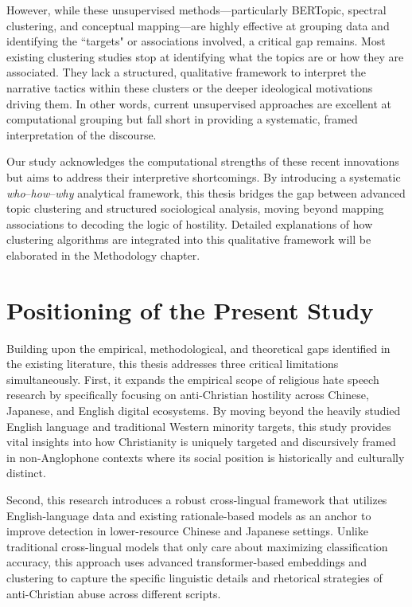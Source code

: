 \documentclass[../CLthesis.tex]{subfiles}
\begin{document}
However, while these unsupervised methods—particularly BERTopic, spectral clustering, and conceptual mapping—are highly effective at grouping data and identifying the ``targets" or associations involved, a critical gap remains. Most existing clustering studies stop at identifying what the topics are or how they are associated. They lack a structured, qualitative framework to interpret the narrative tactics within these clusters or the deeper ideological motivations driving them. In other words, current unsupervised approaches are excellent at computational grouping but fall short in providing a systematic, framed interpretation of the discourse. 

Our study acknowledges the computational strengths of these recent innovations but aims to address their interpretive shortcomings. By introducing a systematic \emph{who}--\emph{how}--\emph{why} analytical framework, this thesis bridges the gap between advanced topic clustering and structured sociological analysis, moving beyond mapping associations to decoding the logic of hostility. Detailed explanations of how clustering algorithms are integrated into this qualitative framework will be elaborated in the Methodology chapter.
\section{Positioning of the Present Study}

Building upon the empirical, methodological, and theoretical gaps identified in the existing literature, this thesis addresses three critical limitations simultaneously. First, it expands the empirical scope of religious hate speech research by specifically focusing on anti-Christian hostility across Chinese, Japanese, and English digital ecosystems. By moving beyond the heavily studied English language and traditional Western minority targets, this study provides vital insights into how Christianity is uniquely targeted and discursively framed in non-Anglophone contexts where its social position is historically and culturally distinct.

Second, this research introduces a robust cross-lingual framework that utilizes English-language data and existing rationale-based models as an anchor to improve detection in lower-resource Chinese and Japanese settings. Unlike traditional cross-lingual models that only care about maximizing classification accuracy, this approach uses advanced transformer-based embeddings and clustering to capture the specific linguistic details and rhetorical strategies of anti-Christian abuse across different scripts.
\end{document}
